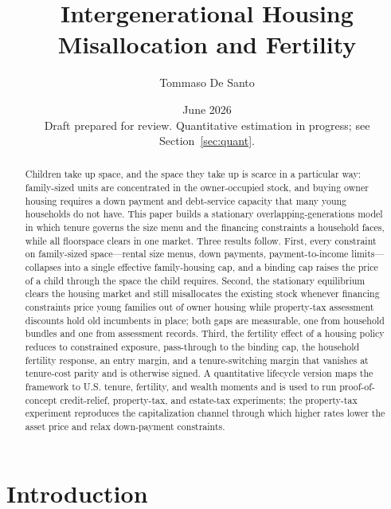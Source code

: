 \documentclass[11pt]{article}
\title{Intergenerational Housing Misallocation and Fertility}
\author{Tommaso De Santo}
\date{June 2026\\[0.4em]\small Draft prepared for review. Quantitative estimation in progress; see Section~\ref{sec:quant}.}
\newcommand{\1}{\mathbf 1}
\begin{document}
\maketitle

\begin{abstract}
\noindent Children take up space, and the space they take up is scarce in a particular way: family-sized units are concentrated in the owner-occupied stock, and buying owner housing requires a down payment and debt-service capacity that many young households do not have. This paper builds a stationary overlapping-generations model in which tenure governs the size menu and the financing constraints a household faces, while all floorspace clears in one market. Three results follow. First, every constraint on family-sized space---rental size menus, down payments, payment-to-income limits---collapses into a single effective family-housing cap, and a binding cap raises the price of a child through the space the child requires. Second, the stationary equilibrium clears the housing market and still misallocates the existing stock whenever financing constraints price young families out of owner housing while property-tax assessment discounts hold old incumbents in place; both gaps are measurable, one from household bundles and one from assessment records. Third, the fertility effect of a housing policy reduces to constrained exposure, pass-through to the binding cap, the household fertility response, an entry margin, and a tenure-switching margin that vanishes at tenure-cost parity and is otherwise signed. A quantitative lifecycle version maps the framework to U.S. tenure, fertility, and wealth moments and is used to run proof-of-concept credit-relief, property-tax, and estate-tax experiments; the property-tax experiment reproduces the capitalization channel through which higher rates lower the asset price and relax down-payment constraints.
\end{abstract}

\vspace{0.5em}

\section{Introduction}
\label{sec:intro}
\end{document}
